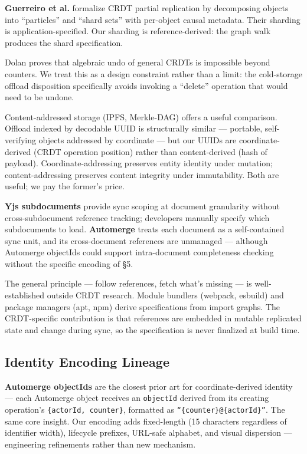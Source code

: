 \textbf{Guerreiro et al.}\cite{guerreiro2015partial} formalize CRDT partial replication by decomposing objects into ``particles'' and ``shard sets'' with per-object causal metadata. Their sharding is application-specified. Our sharding is reference-derived: the graph walk produces the shard specification.

Dolan\cite{dolan2020undoable} proves that algebraic undo of general CRDTs is impossible beyond counters. We treat this as a design constraint rather than a limit: the cold-storage offload disposition specifically avoids invoking a ``delete'' operation that would need to be undone.

Content-addressed storage (IPFS, Merkle-DAG) offers a useful comparison. Offload indexed by decodable UUID is structurally similar --- portable, self-verifying objects addressed by coordinate --- but our UUIDs are coordinate-derived (CRDT operation position) rather than content-derived (hash of payload). Coordinate-addressing preserves entity identity under mutation; content-addressing preserves content integrity under immutability. Both are useful; we pay the former's price.

\textbf{Yjs subdocuments}\cite{yjs:subdocs} provide sync scoping at document granularity without cross-subdocument reference tracking; developers manually specify which subdocuments to load. \textbf{Automerge}\cite{kleppmann2017automerge} treats each document as a self-contained sync unit, and its cross-document references are unmanaged --- although Automerge objectIds could support intra-document completeness checking without the specific encoding of \S5.

The general principle --- follow references, fetch what's missing --- is well-established outside CRDT research. Module bundlers (webpack, esbuild) and package managers (apt, npm) derive specifications from import graphs. The CRDT-specific contribution is that references are embedded in mutable replicated state and change during sync, so the specification is never finalized at build time.

\subsection{Identity Encoding Lineage}

\textbf{Automerge objectIds}\cite{kleppmann2017automerge} are the closest prior art for coordinate-derived identity --- each Automerge object receives an \texttt{objectId} derived from its creating operation's \texttt{\{actorId, counter\}}, formatted as \texttt{``\{counter\}@\{actorId\}''}. The same core insight. Our encoding adds fixed-length (15 characters regardless of identifier width), lifecycle prefixes, URL-safe alphabet, and visual dispersion --- engineering refinements rather than new mechanism.

